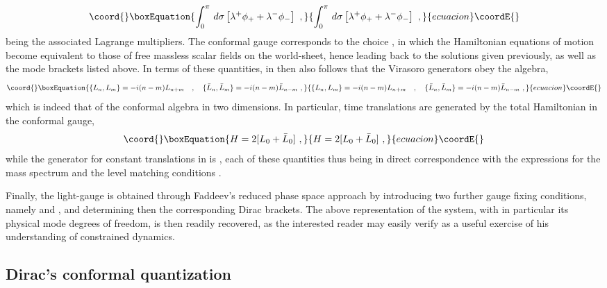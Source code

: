 \documentclass[a4paper,11pt]{article}
\begin{document}
\begin{equation}\coord{}\boxEquation{
\int_0^\pi\,d\sigma\left[\lambda^+\phi_++\lambda^-\phi_-\right]\ ,
}{
\int_0^\pi\,d\sigma\left[\lambda^+\phi_++\lambda^-\phi_-\right]\ ,
}{ecuacion}\coordE{}\end{equation}
\myHighlight{$\lambda^\pm(\tau,\sigma)$}\coordHE{} being the associated Lagrange
multipliers. The conformal gauge corresponds to the choice 
\coordHE{}, in which the Hamiltonian equations of motion
become equivalent to those of free massless scalar fields \coordHE{}
on the world-sheet, hence leading back to the solutions given previously,
as well as the mode brackets listed above. In terms of these quantities, in 
then also follows that the Virasoro generators obey the algebra,
\begin{equation}\coord{}\boxEquation{
\{L_n,L_m\}=-i(n-m)L_{n+m}\ \ \ ,\ \ \ 
\{\bar{L}_n,\bar{L}_m\}=-i(n-m)\bar{L}_{n-m}\ ,
}{
\{L_n,L_m\}=-i(n-m)L_{n+m}\ \ \ ,\ \ \ 
\{\bar{L}_n,\bar{L}_m\}=-i(n-m)\bar{L}_{n-m}\ ,
}{ecuacion}\coordE{}\end{equation}
which is indeed that of the conformal algebra in two dimensions.
In particular, time translations are generated by the total Hamiltonian
in the conformal gauge,
\begin{equation}\coord{}\boxEquation{
H=2[L_0+\bar{L}_0]\ ,
}{
H=2[L_0+\bar{L}_0]\ ,
}{ecuacion}\coordE{}\end{equation}
while the generator for constant translations in \myHighlight{$\sigma$}\coordHE{} is \coordHE{},
each of these quantities thus being in direct correspondence with the
expressions for the mass spectrum \myHighlight{$\alpha'M^2/2$}\coordHE{} and the level matching
conditions \myHighlight{$N=\bar{N}$}\coordHE{}.

Finally, the light-gauge is obtained through Faddeev's reduced phase
space approach by introducing two further gauge fixing conditions,
namely \myHighlight{$x^+=2\alpha' P^+\tau$}\coordHE{} and \coordHE{}, and determining then
the corresponding Dirac brackets. The above representation of the system,
with in particular its physical mode degrees of freedom, is then readily
recovered, as the interested reader may easily verify as a useful exercise
of his understanding of constrained dynamics.

\subsection{Dirac's conformal quantization}
\label{Subsect7.4}
\end{document}
